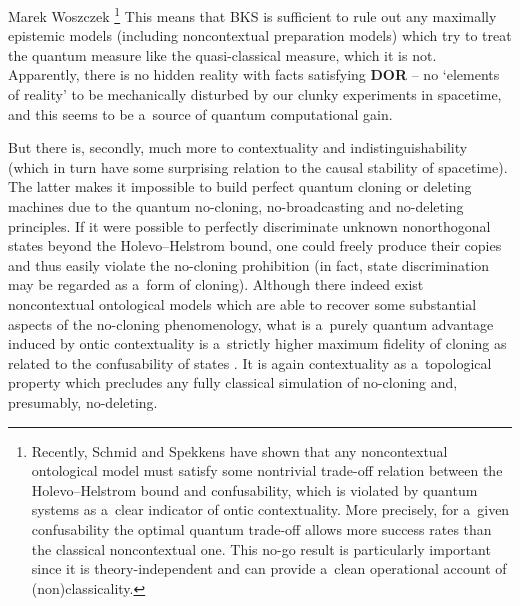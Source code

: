 \begin{artengenv}{Marek Woszczek}
\footnote{Recently, Schmid and Spekkens 
\parencite*[][]{schmid_contextual_2018} %
 have shown that any noncontextual ontological model must satisfy some nontrivial trade-off relation between the Holevo–Helstrom bound and confusability, which is violated by quantum systems as a~clear indicator of ontic contextuality. More precisely, for a~given confusability the optimal quantum trade-off allows more success rates than the classical noncontextual one. This no-go result is particularly important since it is theory-independent and can provide a~clean operational account of (non)classicality. } This means that BKS is sufficient to rule out any maximally epistemic models (including noncontextual preparation models) which try to treat the quantum measure like the quasi-classical measure, which it is not. Apparently, there is no hidden reality with facts satisfying \textbf{DOR} -- no ‘elements of reality' to be mechanically disturbed by our clunky experiments in spacetime, and this seems to be a~source of quantum computational gain.

But there is, secondly, much more to contextuality and indistinguishability (which in turn have some surprising relation to the causal stability of spacetime). The latter makes it impossible to build perfect quantum cloning or deleting machines due to the quantum no-cloning, no-broadcasting and no-deleting principles. If it were possible to perfectly discriminate unknown nonorthogonal states beyond the Holevo–Helstrom bound, one could freely produce their copies and thus easily violate the no-cloning prohibition (in fact, state discrimination may be regarded as a~form of cloning). Although there indeed exist noncontextual ontological models which are able to recover some substantial aspects of the no-cloning phenomenology, what is a~purely quantum advantage induced by ontic contextuality is a~strictly higher maximum fidelity of cloning as related to the confusability of states
\parencite[][]{lostaglio_contextual_2020}. %
 It is again contextuality as a~topological property which precludes any fully classical simulation of no-cloning and, presumably, no-deleting.


\end{artengenv}
